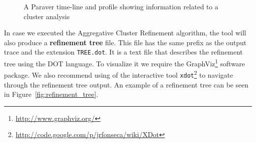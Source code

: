 \documentclass[twoside,a4,english,11pt]{book}
\begin{document}
\begin{figure}
  \centering
  
  
  \caption{A Paraver time-line and profile showing information related
  to a cluster analysis}
  \label{fig:paraver_clustering}
\end{figure}

In case we executed the Aggregative Cluster Refinement algorithm, the tool
will also produce a \textbf{refinement tree} file. This file has the same 
prefix as the output trace and the extension \texttt{TREE.dot}. It is a
text file that describes the refinement tree using the DOT language. To
visualize it we require the GraphViz\footnote{\url{http://www.graphviz.org/}}
software package. We also recommend using of the interactive tool 
\texttt{xdot}\footnote{\url{http://code.google.com/p/jrfonseca/wiki/XDot}}
to navigate through the refinement tree output. An example of a refinement
tree can be seen in Figure~\ref{fig:refinement_tree}.
\end{document}

